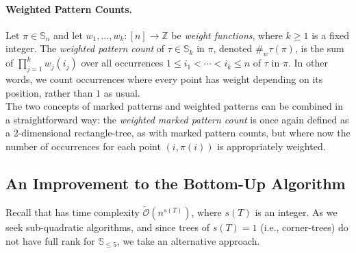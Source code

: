 \documentclass{article}
\newcommand{\Sn}{\mathbb{S}_n}
\newcommand{\ZZ}{\mathbb{Z}}
\newcommand{\pcw}[2]{{\#_w \mathtt{ #1 } \left( #2 \right)}}
\theoremstyle{remark}
\newcommand{\Otilde}[1]{\widetilde{\mathcal{O}}\left( #1 \right)}
\theoremstyle{plain}
\begin{document}
\paragraph{Weighted Pattern Counts.}
Let $\pi\in\Sn$ and let $w_1,\ldots,w_k:[n]\to\ZZ$ be \emph{weight functions}, where $k\ge 1$ is a fixed integer. The \emph{weighted pattern count} of $\tau\in\mathbb{S}_k$ in $\pi$, denoted $\pcw{\tau}{\pi}$, is the sum of $\prod_{j=1}^k w_j(i_j)$ over all occurrences $1\le i_1 < \cdots < i_k \le n$ of $\tau$ in $\pi$.
In other words, we count occurrences where every point has weight depending on its position, rather than $1$ as usual.
\ \\

The two concepts of marked patterns and weighted patterns can be combined in a straightforward way:
the \emph{weighted marked pattern count} is once again defined as a $2$-dimensional rectangle-tree,
as with marked pattern counts, but where 
now the number of occurrences for each point $(i,\pi(i))$ is appropriately weighted.

\subsection{An Improvement to the Bottom-Up Algorithm}
\label{subsect:bottom-up-improve}

Recall that  has time complexity $\Otilde{n^{s(T)}}$, where $s(T)$ is an integer.
As we seek sub-quadratic algorithms,
and since trees of $s(T)=1$ (i.e., corner-trees) do not have full rank
for $\mathbb{S}_{\le 5}$, we take an alternative approach. \ \\
\end{document}
